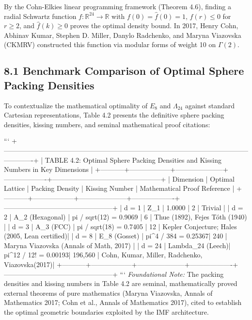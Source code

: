\documentclass[11pt,twoside,openright]{amsbook}
\begin{document}
By the Cohn-Elkies linear programming framework (Theorem 4.6), finding a radial Schwartz function $f \colon \mathbb{R}^{24} \to \mathbb{R}$ with $f(0) = \hat{f}(0) = 1$, $f(r) \le 0$ for $r \ge 2$, and $\hat{f}(k) \ge 0$ proves the optimal density bound.
In 2017, Henry Cohn, Abhinav Kumar, Stephen D. Miller, Danylo Radchenko, and Maryna Viazovska (CKMRV) constructed this function via modular forms of weight 10 on $\Gamma(2)$.

\subsection{8.1 Benchmark Comparison of Optimal Sphere Packing Densities}

To contextualize the mathematical optimality of $E_8$ and $\Lambda_{24}$ against standard Cartesian representations, Table 4.2 presents the definitive sphere packing densities, kissing numbers, and seminal mathematical proof citations:

```
+-------------------------------------------------------------------------------------------------------------------------+
| TABLE 4.2: Optimal Sphere Packing Densities and Kissing Numbers in Key Dimensions                                       |
+-----------+------------------+---------------------+-------------------+------------------------------------------------+
| Dimension | Optimal Lattice  | Packing Density     | Kissing Number    | Mathematical Proof Reference                   |
+-----------+------------------+---------------------+-------------------+------------------------------------------------+
| d = 1     | Z_1              | 1.0000              | 2                 | Trivial                                        |
| d = 2     | A_2 (Hexagonal)  | pi / sqrt(12) = 0.9069 | 6              | Thue (1892), Fejes Tóth (1940)                 |
| d = 3     | A_3 (FCC)        | pi / sqrt(18) = 0.7405 | 12             | Kepler Conjecture; Hales (2005, Lean certified)|
| d = 8     | E_8 (Gosset)     | pi^4 / 384 = 0.25367| 240               | Maryna Viazovska (Annals of Math, 2017)        |
| d = 24    | Lambda_24 (Leech)| pi^12 / 12! = 0.00193| 196,560          | Cohn, Kumar, Miller, Radchenko, Viazovska(2017)|
+-----------+------------------+---------------------+-------------------+------------------------------------------------+
```
\textit{Foundational Note:} The packing densities and kissing numbers in Table 4.2 are seminal, mathematically proved external theorems of pure mathematics (Maryna Viazovska, Annals of Mathematics 2017; Cohn et al., Annals of Mathematics 2017), cited to establish the optimal geometric boundaries exploited by the IMF architecture.
\end{document}

